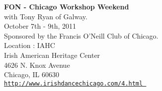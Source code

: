 \vspace{0pt}
{\large\textbf{FON - Chicago Workshop Weekend}}\\ 

with Tony Ryan of Galway.\\October 7th - 9th, 2011\\ Sponsored by the Francis O'Neill Club of Chicago.\\

\vspace*{0.5em}
Location : IAHC\\
Irish American Heritage Center\\
4626 N. Knox Avenue\\
Chicago, IL  60630 \\

\href{http://www.irishdancechicago.com/4.html}{\tt http://www.irishdancechicago.com/4.html }
